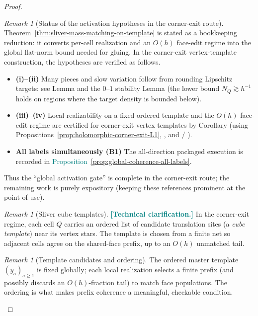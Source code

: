 \documentclass[11pt]{article}
\newcommand{\REVMZ}[1]{\textcolor{teal}{#1}}  %
\numberwithin{equation}{section}  %
\theoremstyle{plain}
\theoremstyle{definition}
\theoremstyle{remark}
\newtheorem{remark}[theorem]{Remark}
\begin{document}
\begin{proof}
\begin{remark}[Status of the activation hypotheses in the corner-exit route]\label{rem:activation-hypotheses-status}
Theorem~\ref{thm:sliver-mass-matching-on-template} is stated as a bookkeeping reduction: it converts per-cell realization and an $O(h)$ face-edit regime
into the global flat-norm bound needed for gluing.
In the corner-exit vertex-template construction, the hypotheses are verified as follows.
\begin{itemize}
\item \textbf{(i)--(ii)} Many pieces and slow variation follow from rounding Lipschitz targets: see Lemma and the
$0$--$1$ stability Lemma (the lower bound $N_Q\gtrsim h^{-1}$ holds on regions where the target density is bounded below).
\item \textbf{(iii)--(iv)} Local realizability on a fixed ordered template and the $O(h)$ face-edit regime are certified for corner-exit vertex templates by
Corollary (using Propositions~\ref{prop:holomorphic-corner-exit-L1}, ,
and  / ).
\item \textbf{All labels simultaneously (B1)} The all-direction packaged execution is recorded in \REVMZ{Proposition~\ref{prop:global-coherence-all-labels}}.
\end{itemize}
Thus the ``global activation gate'' is complete in the corner-exit route; the remaining work is purely expository (keeping these references prominent at the point of use).
\end{remark}



\begin{remark}[Sliver cube templates]\label{rem:sliver-cube-templates}
\REVMZ{\textbf{[Technical clarification.]}}
In the corner-exit regime, each cell $Q$ carries an ordered list of candidate translation sites (a \emph{cube template})
near its vertex stars.  The template is chosen from a finite net so adjacent cells agree on the shared-face prefix,
up to an $O(h)$ unmatched tail.
\end{remark}



\begin{remark}[Template candidates and ordering]\label{rem:sliver-template-candidates}
The ordered master template $(y_a)_{a\ge1}$ is fixed globally; each local realization selects a finite prefix
(and possibly discards an $O(h)$-fraction tail) to match face populations.  The ordering is what makes
prefix coherence a meaningful, checkable condition.
\end{remark}





\end{proof}
\end{document}
